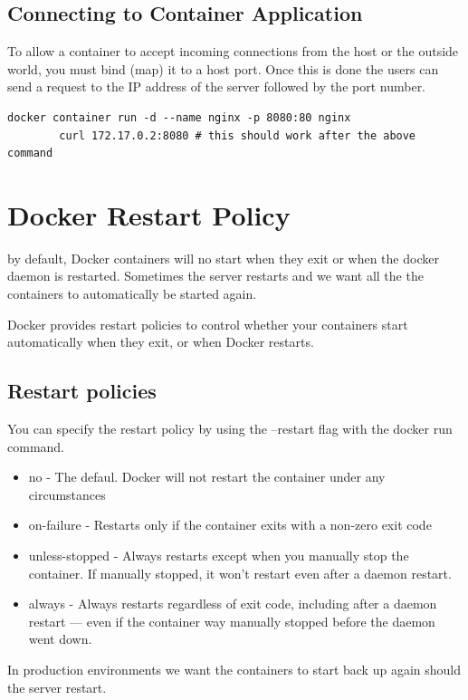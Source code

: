 \documentclass[11pt]{book}
\begin{document}
    \subsection{Connecting to Container Application}
    To allow a container to accept incoming connections from the host or the outside world, you must bind (map) it to a host port.
    Once this is done the users can send a request to the IP address of the server followed by the port number.

    \begin{lstlisting}[style=terminal]
        docker container run -d --name nginx -p 8080:80 nginx
        curl 172.17.0.2:8080 # this should work after the above command
    \end{lstlisting}

    \section{Docker Restart Policy}
    by default, Docker containers will no start when they exit or when the docker daemon is restarted.
    Sometimes the server restarts and we want all the the containers to automatically be started again.

    Docker provides restart policies to control whether your containers start automatically when they exit, or when Docker restarts.

    \subsection{Restart policies}
    You can specify the restart policy by using the --restart flag with the docker run command.
    \begin{itemize}
        \item no - The defaul. Docker will not restart the container under any circumstances
        \item on-failure - Restarts only if the container exits with a non-zero exit code
        \item unless-stopped - Always restarts except when you manually stop the container. If manually stopped, it won't restart even after a daemon restart.
        \item always - Always restarts regardless of exit code, including after a daemon restart --- even if the container way manually stopped before the daemon went down.
    \end{itemize}

    In production environments we want the containers to start back up again should the server restart.
\end{document}
